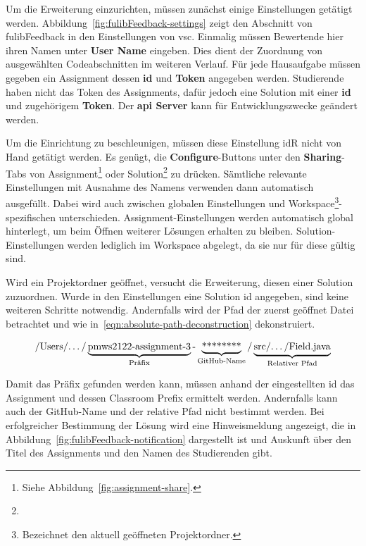 Um die Erweiterung einzurichten, müssen zunächst einige Einstellungen getätigt werden.
Abbildung~\ref{fig:fulibFeedback-settings} zeigt den Abschnitt von fulibFeedback in den Einstellungen von \ac{vsc}.
Einmalig müssen Bewertende hier ihren Namen unter \textbf{User Name} eingeben.
Dies dient der Zuordnung von ausgewählten Codeabschnitten im weiteren Verlauf.
Für jede Hausaufgabe müssen gegeben ein Assignment dessen \textbf{\acs{id}} und \textbf{Token} angegeben werden.
Studierende haben nicht das Token des Assignments, dafür jedoch eine Solution mit einer \textbf{\acs{id}} und zugehörigem \textbf{Token}.
Der \textbf{\acs{api} Server} kann für Entwicklungszwecke geändert werden.

Um die Einrichtung zu beschleunigen, müssen diese Einstellung \ac{idR} nicht von Hand getätigt werden.
Es genügt, die \textbf{Configure}-Buttons unter den \textbf{Sharing}-Tabs von Assignment\footnote{
    Siehe Abbildung~\ref{fig:assignment-share}.
} oder Solution\footnote{
} zu drücken.
Sämtliche relevante Einstellungen mit Ausnahme des Namens verwenden dann automatisch ausgefüllt.
Dabei wird auch zwischen globalen Einstellungen und Workspace\footnote{
    Bezeichnet den aktuell geöffneten Projektordner.
}-spezifischen unterschieden.
Assignment-Einstellungen werden automatisch global hinterlegt, um beim Öffnen weiterer Lösungen erhalten zu bleiben.
Solution-Einstellungen werden lediglich im Workspace abgelegt, da sie nur für diese gültig sind.

Wird ein Projektordner geöffnet, versucht die Erweiterung, diesen einer Solution zuzuordnen.
Wurde in den Einstellungen eine Solution \acs{id} angegeben, sind keine weiteren Schritte notwendig.
Andernfalls wird der Pfad der zuerst geöffnet Datei betrachtet und wie in~\ref{eqn:absolute-path-deconstruction} dekonstruiert.

\begin{equation}\label{eqn:absolute-path-deconstruction}
    \text{/Users/\dots/}
    \underbrace{\text{pmws2122-assignment-3}}_{\text{Präfix}}
    \text{-}
    \underbrace{\text{********}}_{\text{GitHub-Name}}
    \text{/}
    \underbrace{\text{src/\dots/Field.java}}_{\text{Relativer Pfad}}
\end{equation}

Damit das Präfix gefunden werden kann, müssen anhand der eingestellten \acs{id} das Assignment und dessen Classroom Prefix ermittelt werden.
Andernfalls kann auch der GitHub-Name und der relative Pfad nicht bestimmt werden.
Bei erfolgreicher Bestimmung der Lösung wird eine Hinweismeldung angezeigt, die in Abbildung~\ref{fig:fulibFeedback-notification} dargestellt ist und Auskunft über den Titel des Assignments und den Namen des Studierenden gibt.

